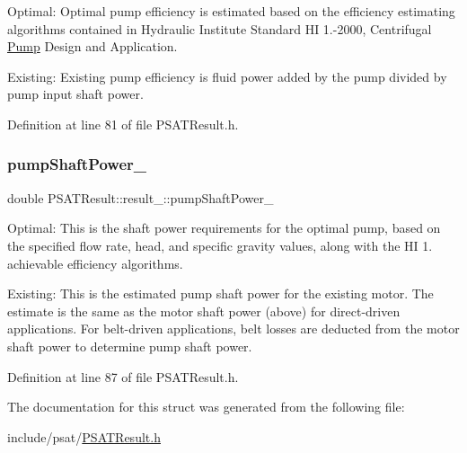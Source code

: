 Optimal\+: Optimal pump efficiency is estimated based on the efficiency estimating algorithms contained in Hydraulic Institute Standard HI 1.-\/2000, Centrifugal \hyperlink{class_pump}{Pump} Design and Application. 

Existing\+: Existing pump efficiency is fluid power added by the pump divided by pump input shaft power. 

Definition at line 81 of file P\+S\+A\+T\+Result.\+h.

\mbox{\label{struct_p_s_a_t_result_1_1result___a825e4641aa3bac34b72a9494a3d623e3}} 
\subsubsection{\texorpdfstring{pump\+Shaft\+Power\+\_\+}{pumpShaftPower\_}}
{\footnotesize\ttfamily double P\+S\+A\+T\+Result\+::result\+\_\+\+::pump\+Shaft\+Power\+\_\+}



Optimal\+: This is the shaft power requirements for the optimal pump, based on the specified flow rate, head, and specific gravity values, along with the HI 1. achievable efficiency algorithms. 

Existing\+: This is the estimated pump shaft power for the existing motor. The estimate is the same as the motor shaft power (above) for direct-\/driven applications. For belt-\/driven applications, belt losses are deducted from the motor shaft power to determine pump shaft power. 

Definition at line 87 of file P\+S\+A\+T\+Result.\+h.



The documentation for this struct was generated from the following file\+:\begin{DoxyCompactItemize}
\item 
include/psat/\hyperlink{_p_s_a_t_result_8h}{P\+S\+A\+T\+Result.\+h}\end{DoxyCompactItemize}
